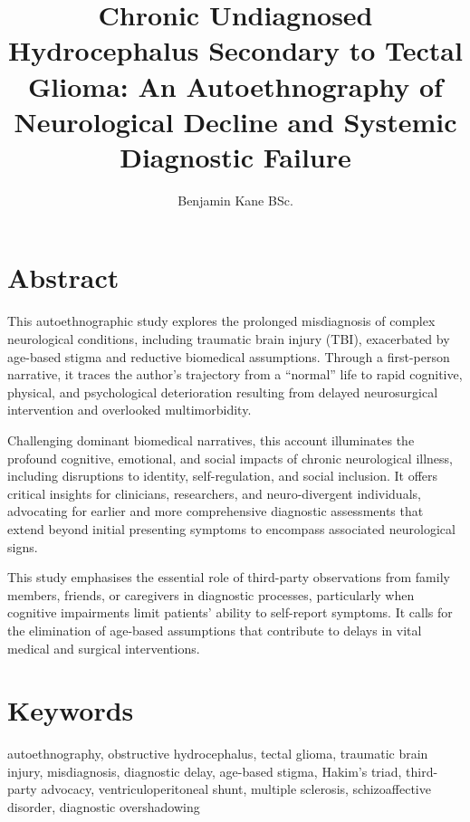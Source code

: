 \documentclass{article}
\title{Chronic Undiagnosed Hydrocephalus Secondary to Tectal Glioma: An Autoethnography of Neurological Decline and Systemic Diagnostic Failure}
\author{Benjamin Kane BSc.}
\begin{document}
\maketitle

\section*{Abstract}
\noindent This autoethnographic study explores the prolonged misdiagnosis of complex neurological conditions, including traumatic brain injury (TBI), exacerbated by age-based stigma and reductive biomedical assumptions. Through a first-person narrative, it traces the author’s trajectory from a “normal” life to rapid cognitive, physical, and psychological deterioration resulting from delayed neurosurgical intervention and overlooked multimorbidity.

Challenging dominant biomedical narratives, this account illuminates the profound cognitive, emotional, and social impacts of chronic neurological illness, including disruptions to identity, self-regulation, and social inclusion. It offers critical insights for clinicians, researchers, and neuro-divergent individuals, advocating for earlier and more comprehensive diagnostic assessments that extend beyond initial presenting symptoms to encompass associated neurological signs.

This study emphasises the essential role of third-party observations from family members, friends, or caregivers in diagnostic processes, particularly when cognitive impairments limit patients’ ability to self-report symptoms. It calls for the elimination of age-based assumptions that contribute to delays in vital medical and surgical interventions.

\section*{Keywords}
\noindent
autoethnography, obstructive hydrocephalus, tectal glioma, traumatic brain injury, misdiagnosis, diagnostic delay, age-based stigma, Hakim’s triad, third-party advocacy, ventriculoperitoneal shunt, multiple sclerosis, schizoaffective disorder, diagnostic overshadowing
\end{document}
